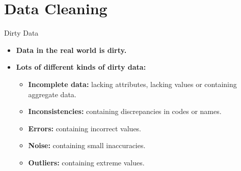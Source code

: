 \section{Data Cleaning}

\begin{frame}{Dirty Data}
	\begin{itemize}
		\item \textbf{Data in the real world is {\color{airforceblue}dirty}.}
		\item \textbf{Lots of different kinds of dirty data:}
		      \begin{itemize}
			      \item \textbf{Incomplete data:} lacking attributes, lacking values or containing aggregate data.
			      \item \textbf{Inconsistencies:} containing discrepancies in codes or names.
			      \item \textbf{Errors:} containing incorrect values.
			      \item \textbf{Noise:} containing small inaccuracies.
			      \item \textbf{Outliers:} containing extreme values.
		      \end{itemize}
	\end{itemize}
\end{frame}

